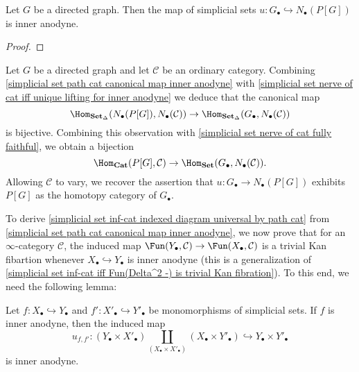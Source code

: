 \begin{proposition}\label{simplicial set path cat canonical map inner anodyne}
Let $G$ be a directed graph. Then the map of simplicial sets $u:G_\bullet\hookrightarrow N_\bullet(P[G])$ is inner anodyne.
\end{proposition}
\begin{proof}

\end{proof}
\begin{remark}
Let $G$ be a directed graph and let $\mathcal{C}$ be an ordinary category. Combining \cref{simplicial set path cat canonical map inner anodyne} with \cref{simplicial set nerve of cat iff unique lifting for inner anodyne} we deduce that the canonical map
\[\Hom_{\mathbf{Set}_\Delta}(N_\bullet(P[G]),N_\bullet(\mathcal{C}))\to\Hom_{\mathbf{Set}_\Delta}(G_\bullet,N_\bullet(\mathcal{C}))\]
is bijective. Combining this observation with \cref{simplicial set nerve of cat fully faithful}, we obtain a bijection
\[\Hom_{\mathbf{Cat}}(P[G],\mathcal{C})\to\Hom_{\mathbf{Set}}(G_\bullet,N_\bullet(\mathcal{C})).\]
Allowing $\mathcal{C}$ to vary, we recover the assertion that $u:G_\bullet\to N_\bullet(P[G])$ exhibits $P[G]$ as the homotopy category of $G_\bullet$.
\end{remark}
To derive \cref{simplicial set inf-cat indexed diagram universal by path cat} from \cref{simplicial set path cat canonical map inner anodyne}, we now prove that for an $\infty$-category $\mathcal{C}$, the induced map $\Fun(Y_\bullet,\mathcal{C})\to\Fun(X_\bullet,\mathcal{C})$ is a trivial Kan fibartion whenever $X_\bullet\hookrightarrow Y_\bullet$ is inner anodyne (this is a generalization of \cref{simplicial set inf-cat iff Fun(Delta^2 -) is trivial Kan fibration}). To this end, we need the following lemma:
\begin{lemma}\label{simplicial set inner anodyne product prop}
Let $f:X_\bullet\hookrightarrow Y_\bullet$ and $f':X'_\bullet\hookrightarrow Y'_\bullet$ be monomorphisms of simplicial sets. If $f$ is inner anodyne, then the induced map
\[u_{f,f'}:(Y_\bullet\times X'_\bullet)\coprod_{(X_\bullet\times X'_\bullet)}(X_\bullet\times Y'_\bullet)\hookrightarrow Y_\bullet\times Y'_\bullet\]
is inner anodyne.
\end{lemma}
